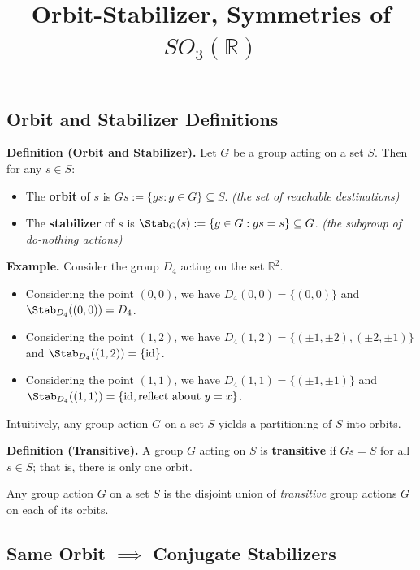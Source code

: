 \title{Orbit-Stabilizer, Symmetries of $SO_3(\mathbb{R})$}



\subsection{Orbit and Stabilizer Definitions}

\textbf{Definition (Orbit and Stabilizer).} Let $G$ be a group acting on a set $S$.  Then for any $s \in S$:
\begin{itemize}
    \item The \textbf{orbit} of $s$ is $Gs := \{gs : g \in G\} \subseteq S$.  \emph{(the set of reachable destinations)}
    \item The \textbf{stabilizer} of $s$ is $\Stab_G(s) := \{g \in G: gs = s\} \subseteq G$.  \emph{(the subgroup of do-nothing actions)}
\end{itemize}

\textbf{Example.} Consider the group $D_4$ acting on the set $\mathbb{R}^2$.
\begin{itemize}
    \item Considering the point $(0, 0)$, we have $D_4(0, 0) = \{(0, 0)\}$ and $\Stab_{D_4}((0, 0)) = D_4$.
    \item Considering the point $(1, 2)$, we have $D_4(1, 2) = \{(\pm 1, \pm 2), (\pm 2, \pm 1)\}$ and $\Stab_{D_4}((1, 2)) = \{\mathrm{id}\}$.
    \item Considering the point $(1, 1)$, we have $D_4(1, 1) = \{(\pm 1, \pm 1)\}$ and $\Stab_{D_4}((1, 1)) = \{\mathrm{id}, \text{reflect about $y = x$}\}$.
\end{itemize}

Intuitively, any group action $G$ on a set $S$ yields a partitioning of $S$ into orbits.

\textbf{Definition (Transitive).} A group $G$ acting on $S$ is \textbf{transitive} if $Gs = S$ for all $s \in S$; that is, there is only one orbit.

\begin{remark}
    Any group action $G$ on a set $S$ is the disjoint union of \emph{transitive} group actions $G$ on each of its orbits.
\end{remark}

\subsection{Same Orbit $\implies$ Conjugate Stabilizers}


